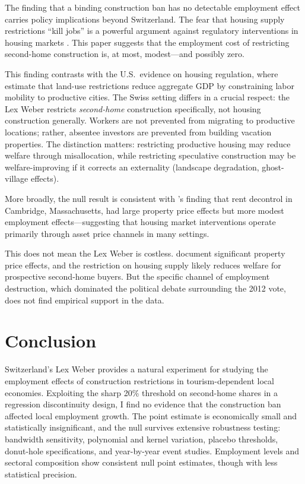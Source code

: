 \documentclass[12pt]{article}
\begin{document}
The finding that a binding construction ban has no detectable employment effect carries policy implications beyond Switzerland. The fear that housing supply restrictions ``kill jobs'' is a powerful argument against regulatory interventions in housing markets \citep{ganong2017, hsieh2019}. This paper suggests that the employment cost of restricting second-home construction is, at most, modest---and possibly zero.

This finding contrasts with the U.S.\ evidence on housing regulation, where \citet{hsieh2019} estimate that land-use restrictions reduce aggregate GDP by constraining labor mobility to productive cities. The Swiss setting differs in a crucial respect: the Lex Weber restricts \textit{second-home} construction specifically, not housing construction generally. Workers are not prevented from migrating to productive locations; rather, absentee investors are prevented from building vacation properties. The distinction matters: restricting productive housing may reduce welfare through misallocation, while restricting speculative construction may be welfare-improving if it corrects an externality (landscape degradation, ghost-village effects).

More broadly, the null result is consistent with \citet{autor2014}'s finding that rent decontrol in Cambridge, Massachusetts, had large property price effects but more modest employment effects---suggesting that housing market interventions operate primarily through asset price channels in many settings.

This does not mean the Lex Weber is costless. \citet{hilber2019} document significant property price effects, and the restriction on housing supply likely reduces welfare for prospective second-home buyers. But the specific channel of employment destruction, which dominated the political debate surrounding the 2012 vote, does not find empirical support in the data.

\section{Conclusion}\label{sec:conclusion}

Switzerland's Lex Weber provides a natural experiment for studying the employment effects of construction restrictions in tourism-dependent local economies. Exploiting the sharp 20\% threshold on second-home shares in a regression discontinuity design, I find no evidence that the construction ban affected local employment growth. The point estimate is economically small and statistically insignificant, and the null survives extensive robustness testing: bandwidth sensitivity, polynomial and kernel variation, placebo thresholds, donut-hole specifications, and year-by-year event studies. Employment levels and sectoral composition show consistent null point estimates, though with less statistical precision.
\end{document}
